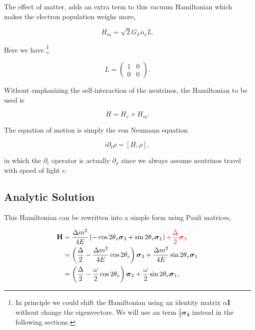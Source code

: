 \documentclass{tufte-handout}
\begin{document}
The effect of matter, adds an extra term to this vacuum Hamiltonian which makes the electron population weighs more,

\begin{equation*}
H_m = \sqrt{2}G_F n_e L.
\end{equation*}

Here we have \footnote{In principle we could shift the Hamiltonian using an identity matrix $\alpha \mathbf{I}$ without change the eigenvectors. We will use an term $\frac{1}{2}\mathbf{\sigma_3} $ instead in the following sections.}

\begin{equation*}
L = \begin{pmatrix} 1 & 0 \\ 0 & 0 \end{pmatrix}.
\end{equation*}


Without emphasizing the self-interaction of the neutrinos, the Hamiltonian to be used is

\begin{equation}
H = H_v + H_m.
\end{equation}

The equation of motion is simply the von Neumann equation

\begin{equation}
i \partial_t \rho = \left[ H , \rho\right],
\end{equation}

in which the $\partial_t$ operator is actually $\partial_x$ since we always assume neutrinos travel with speed of light $c$.


\subsection{Analytic Solution}


This Hamiltonian can be rewritten into a simple form using Pauli matrices,

\begin{align*}
\mathbf H &= \frac{ \Delta m^2 }{4E} \left( -\cos 2\theta_v \boldsymbol {\sigma}_3  + \sin 2\theta_v \boldsymbol{\sigma}_1 \right)  {\color{red} + \frac{\Delta}{2} \boldsymbol{\sigma}_3 } \\
& = \left(\frac{\Delta}{2} -\frac{ \Delta m^2 }{4E} \cos 2\theta_v \right) \boldsymbol{\sigma}_3  + \frac{ \Delta m^2 }{4E} \sin 2\theta_v \boldsymbol{\sigma}_1 \\
& = \left(\frac{\Delta}{2} -\frac{ \omega }{2} \cos 2\theta_v \right) \boldsymbol{\sigma}_3  + \frac{ \omega }{2} \sin 2\theta_v \boldsymbol{\sigma}_1,
\end{align*}
\end{document}
